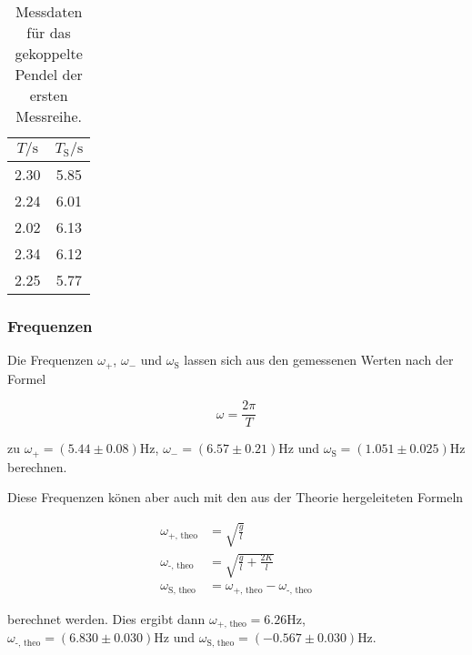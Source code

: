             \begin{table}[H]
                \centering
                \caption{Messdaten für das gekoppelte Pendel der ersten Messreihe.}
                \label{tab:gek1}
                \begin{tabular}{c c}
                 \toprule
                 $T / \si{\s}$ & $T_{\text{S}} / \si{\s}$\\
                 \midrule
                 2.30   & 5.85 \\
                 2.24   & 6.01 \\
                 2.02   & 6.13 \\
                 2.34   & 6.12 \\
                 2.25   & 5.77 \\
                 \bottomrule
                \end{tabular}
            \end{table}

        \subsubsection{Frequenzen}

            \noindent Die Frequenzen $\omega_{+}$, $\omega_{-}$ und $\omega_{\text{S}}$ lassen sich aus den gemessenen Werten nach der Formel 

            \begin{equation*}
                \omega = \frac{2 \pi}{T}
            \end{equation*}

            \noindent zu $\omega_{+} =( 5.44 \pm 0.08) \si{\hertz}$, $\omega_{-} = (6.57 \pm 0.21) \si{\hertz}$ und 
            $ \omega_{\text{S}}= (1.051 \pm 0.025) \si{\hertz}$ berechnen.

            \noindent Diese Frequenzen könen aber auch mit den aus der Theorie hergeleiteten Formeln 

            \begin{align*}
            \omega_\text{+, theo} &= \sqrt{\frac{g}{l}}\\
            \omega_\text{-, theo} &= \sqrt{\frac{g}{l} + \frac{2 K}{l}}\\
            \omega_\text{S, theo} &= \omega_\text{+, theo} - \omega_\text{-, theo}
            \end{align*}

            \noindent berechnet werden. Dies ergibt dann $\omega_\text{+, theo} = 6.26 \si{\hertz}$, $\omega_\text{-, theo} = (6.830 \pm 0.030) \si{\hertz}$ 
            und $\omega_\text{S, theo} = (-0.567 \pm 0.030) \si{\hertz}$.

